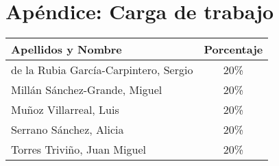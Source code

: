 \documentclass[12pt,a4paper,spanish,twoside]{book}
\begin{document}
% 

% 

\chapter*{Apéndice: Carga de trabajo}
\begin{center}
 \begin{tabular}{|p{10cm}|c|}\hline 
  Apellidos y Nombre & Porcentaje \\ \hline \hline
  de la Rubia García-Carpintero, Sergio & 20\% \\ \hline
  Millán Sánchez-Grande, Miguel & 20\% \\ \hline
  Muñoz Villarreal, Luis & 20\% \\ \hline
  Serrano Sánchez, Alicia & 20\% \\ \hline
  Torres Triviño, Juan Miguel & 20\% \\ \hline 
 \end{tabular}
\end{center}

%  
% 
\end{document}
